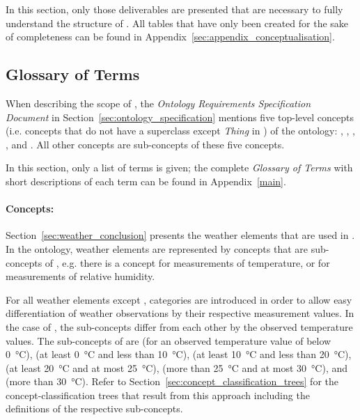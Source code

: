 In this section, only those deliverables are presented that are necessary to fully understand the structure of \smarthomeweather. All tables that have only been created for the sake of completeness can be found in Appendix~\ref{sec:appendix_conceptualisation}.

\subsection{Glossary of Terms}
\label{sec:ontology_glossary}

When describing the scope of \smarthomeweather, the \emph{Ontology Requirements Specification Document} in Section~\ref{sec:ontology_specification} mentions five top-level concepts (i.e. concepts that do not have a superclass except \emph{Thing} in ) of the ontology: , , , , and . All other concepts are sub-concepts of these five concepts.

In this section, only a list of terms is given; the complete \emph{Glossary of Terms} with short descriptions of each term can be found in Appendix~\ref{main}.

\paragraph{Concepts:}

Section~\ref{sec:weather_conclusion} presents the weather elements that are used in \smarthomeweather. In the ontology, weather elements are represented by concepts that are sub-concepts of , e.g. there is a concept  for measurements of temperature, or  for measurements of relative humidity.

For all weather elements except , categories are introduced in order to allow easy differentiation of weather observations by their respective measurement values. In the case of , the sub-concepts differ from each other by the observed temperature values. The sub-concepts of  are  (for an observed temperature value of below \SI{0}{\celsius}),  (at least \SI{0}{\celsius} and less than \SI{10}{\celsius}),  (at least \SI{10}{\celsius} and less than \SI{20}{\celsius}),  (at least \SI{20}{\celsius} and at most \SI{25}{\celsius}),  (more than \SI{25}{\celsius} and at most \SI{30}{\celsius}), and  (more than \SI{30}{\celsius}). Refer to Section~\ref{sec:concept_classification_trees} for the concept-classification trees that result from this approach including the definitions of the respective sub-concepts.


